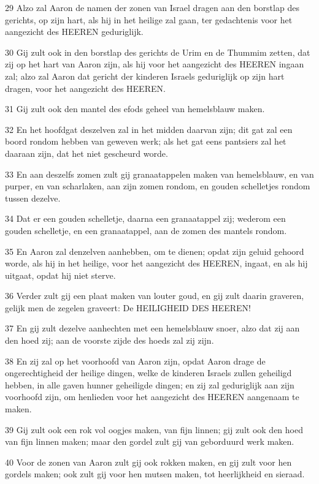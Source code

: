 \par 29 Alzo zal Aaron de namen der zonen van Israel dragen aan den borstlap des gerichts, op zijn hart, als hij in het heilige zal gaan, ter gedachtenis voor het aangezicht des HEEREN geduriglijk.
\par 30 Gij zult ook in den borstlap des gerichts de Urim en de Thummim zetten, dat zij op het hart van Aaron zijn, als hij voor het aangezicht des HEEREN ingaan zal; alzo zal Aaron dat gericht der kinderen Israels geduriglijk op zijn hart dragen, voor het aangezicht des HEEREN.
\par 31 Gij zult ook den mantel des efods geheel van hemelsblauw maken.
\par 32 En het hoofdgat deszelven zal in het midden daarvan zijn; dit gat zal een boord rondom hebben van geweven werk; als het gat eens pantsiers zal het daaraan zijn, dat het niet gescheurd worde.
\par 33 En aan deszelfs zomen zult gij granaatappelen maken van hemelsblauw, en van purper, en van scharlaken, aan zijn zomen rondom, en gouden schelletjes rondom tussen dezelve.
\par 34 Dat er een gouden schelletje, daarna een granaatappel zij; wederom een gouden schelletje, en een granaatappel, aan de zomen des mantels rondom.
\par 35 En Aaron zal denzelven aanhebben, om te dienen; opdat zijn geluid gehoord worde, als hij in het heilige, voor het aangezicht des HEEREN, ingaat, en als hij uitgaat, opdat hij niet sterve.
\par 36 Verder zult gij een plaat maken van louter goud, en gij zult daarin graveren, gelijk men de zegelen graveert: De HEILIGHEID DES HEEREN!
\par 37 En gij zult dezelve aanhechten met een hemelsblauw snoer, alzo dat zij aan den hoed zij; aan de voorste zijde des hoeds zal zij zijn.
\par 38 En zij zal op het voorhoofd van Aaron zijn, opdat Aaron drage de ongerechtigheid der heilige dingen, welke de kinderen Israels zullen geheiligd hebben, in alle gaven hunner geheiligde dingen; en zij zal geduriglijk aan zijn voorhoofd zijn, om henlieden voor het aangezicht des HEEREN aangenaam te maken.
\par 39 Gij zult ook een rok vol oogjes maken, van fijn linnen; gij zult ook den hoed van fijn linnen maken; maar den gordel zult gij van geborduurd werk maken.
\par 40 Voor de zonen van Aaron zult gij ook rokken maken, en gij zult voor hen gordels maken; ook zult gij voor hen mutsen maken, tot heerlijkheid en sieraad.

